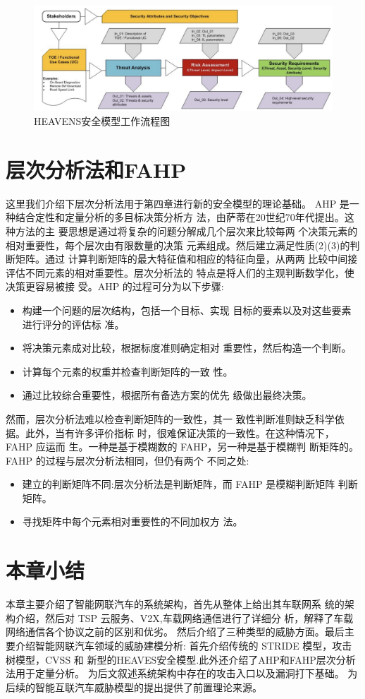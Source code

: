 \begin{figure}
    \centering
    \includegraphics[scale=0.6]{resources/img/i11.png}
    \caption{HEAVENS安全模型工作流程图}
  \end{figure}

  \section{层次分析法和FAHP}
  这里我们介绍下层次分析法用于第四章进行新的安全模型的理论基础。
  AHP 是一种结合定性和定量分析的多目标决策分析方
法，由萨蒂在20世纪70年代提出\cite{saaty1990make}。这种方法的主
要思想是通过将复杂的问题分解成几个层次来比较每两
个决策元素的相对重要性，每个层次由有限数量的决策
元素组成。然后建立满足性质(2)(3)的判断矩阵。通过
计算判断矩阵的最大特征值和相应的特征向量，从两两
比较中间接评估不同元素的相对重要性。层次分析法的
特点是将人们的主观判断数学化，使决策更容易被接
受。AHP 的过程可分为以下步骤:
\begin{itemize}
  \item  构建一个问题的层次结构，包括一个目标、实现
  目标的要素以及对这些要素进行评分的评估标
  准。
  \item  将决策元素成对比较，根据标度准则确定相对
  重要性，然后构造一个判断。
  \item  计算每个元素的权重并检查判断矩阵的一致
  性。
  \item 通过比较综合重要性，根据所有备选方案的优先
  级做出最终决策。
\end{itemize}

然而，层次分析法难以检查判断矩阵的一致性，其一
致性判断准则缺乏科学依据。此外，当有许多评价指标
时，很难保证决策的一致性。在这种情况下，FAHP 应运而
生\cite{min1997fuzzy}。一种是基于模糊数的 FAHP，另一种是基于模糊判
断矩阵的。FAHP 的过程与层次分析法相同，但仍有两个
不同之处:
\begin{itemize}
  \item  建立的判断矩阵不同:层次分析法是判断矩阵，而
  FAHP 是模糊判断矩阵
  判断矩阵。
  \item  寻找矩阵中每个元素相对重要性的不同加权方
  法。
\end{itemize}


\section{本章小结}

本章主要介绍了智能网联汽车的系统架构，首先从整体上给出其车联网系
统的架构介绍，然后对 TSP 云服务、V2X,车载网络通信进行了详细分
析，解释了车载网络通信各个协议之前的区别和优劣。
然后介绍了三种类型的威胁方面。最后主要介绍智能网联汽车领域的威胁建模分析:
首先介绍传统的 STRIDE 模型，攻击树模型，CVSS 和 新型的HEAVES安全模型.此外还介绍了AHP和FAHP层次分析法用于定量分析。
为后文叙述系统架构中存在的攻击入口以及漏洞打下基础。
为后续的智能互联汽车威胁模型的提出提供了前置理论来源。